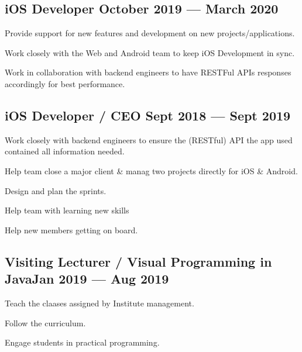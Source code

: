 \documentclass[letter,10pt]{article}
\begin{document}
\subsection{{iOS Developer \hfill October 2019 --- March 2020}}
\begin{zitemize}
\item Provide support for new features and development on new projects/applications.
\item Work closely with the Web and Android team to keep iOS Development in sync.
\item Work in collaboration with backend engineers to have RESTFul APIs responses accordingly for best performance.
\end{zitemize}

\subsection{{iOS Developer / CEO \hfill Sept 2018 --- Sept 2019}}
\begin{zitemize}
\item Work closely with backend engineers to ensure the (RESTful) API the app used contained all information needed.
\item Help team close a major client \& manag two projects directly for iOS \& Android.
\item Design and plan the sprints.
\item Help team with learning new skills
\item Help new members getting on board.
\end{zitemize}

\subsection{{Visiting Lecturer / Visual Programming in Java\hfill Jan 2019 --- Aug 2019}}
\begin{zitemize}
\item Teach the claases assigned by Institute management.
\item Follow the curriculum.
\item Engage students in practical programming.
\end{zitemize}
\end{document}
